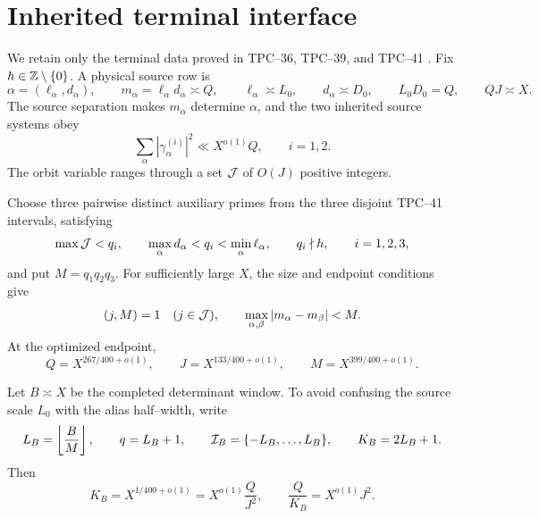 \section{Inherited terminal interface}
\label{sec:tpc42-interface}

We retain only the terminal data proved in TPC--36, TPC--39, and
TPC--41 \citep{WangTPC36,WangTPC39,WangTPC41}.  Fix
\(h\in\mathbb Z\setminus\{0\}\).  A physical source row is
\begin{equation}
 \alpha=(\ell_\alpha,d_\alpha),
 \qquad m_\alpha=\ell_\alpha d_\alpha\asymp Q,
 \qquad \ell_\alpha\asymp L_0,
 \qquad d_\alpha\asymp D_0,
 \qquad L_0D_0=Q,
 \qquad QJ\asymp X.
 \label{eq:tpc42-row-scales}
\end{equation}
The source separation makes \(m_\alpha\) determine \(\alpha\), and the
two inherited source systems obey
\begin{equation}
 \sum_\alpha |\gamma_\alpha^{(i)}|^2
 \ll X^{o(1)}Q,
 \qquad i=1,2.
 \label{eq:tpc42-source-l2}
\end{equation}
The orbit variable ranges through a set \(\mathcal J\) of \(O(J)\) positive
integers.

Choose three pairwise distinct auxiliary primes from the three disjoint
TPC--41 intervals, satisfying
\begin{equation}
 \max\mathcal J<q_i,
 \qquad
 \max_\alpha d_\alpha<q_i<\min_\alpha\ell_\alpha,
 \qquad q_i\nmid h,
 \qquad i=1,2,3,
 \label{eq:tpc42-admissible-primes}
\end{equation}
and put \(M=q_1q_2q_3\).  For sufficiently large \(X\), the size and
endpoint conditions give
\begin{equation}
 (j,M)=1\quad(j\in\mathcal J),
 \qquad
 \max_{\alpha,\beta}|m_\alpha-m_\beta|<M.
 \label{eq:tpc42-no-wrap-data}
\end{equation}
At the optimized endpoint,
\begin{equation}
 Q=X^{267/400+o(1)},
 \qquad J=X^{133/400+o(1)},
 \qquad M=X^{399/400+o(1)}.
 \label{eq:tpc42-endpoint}
\end{equation}

Let \(B\asymp X\) be the completed determinant window.  To avoid
confusing the source scale \(L_0\) with the alias half--width, write
\begin{equation}
 L_B=\left\lfloor\frac BM\right\rfloor,
 \qquad q=L_B+1,
 \qquad \mathcal I_B=\{-L_B,\ldots,L_B\},
 \qquad K_B=2L_B+1.
 \label{eq:tpc42-alias-data}
\end{equation}
Then
\begin{equation}
 K_B=X^{1/400+o(1)}
 =X^{o(1)}\frac{Q}{J^2},
 \qquad
 \frac{Q}{K_B}=X^{o(1)}J^2.
 \label{eq:tpc42-missing-ledger}
\end{equation}

